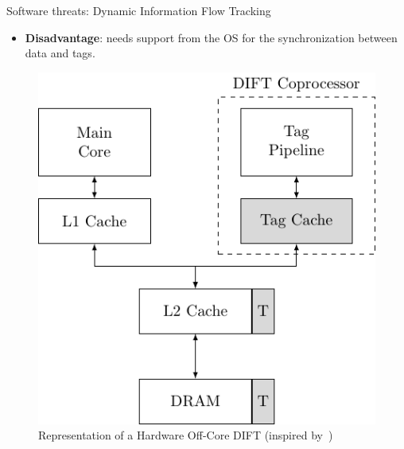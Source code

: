 \begin{frame}{Software threats: Dynamic Information Flow Tracking}
\begin{minipage}[c]{0.45\textwidth}
        \begin{alertblock}{}
            \begin{itemize}
                [square]
                \justifying
                \item \textbf{Disadvantage}: needs support from the OS for the synchronization between data and tags.
            \end{itemize}
        \end{alertblock}
    \end{minipage}\hfill%
    \begin{minipage}[c]{0.5\textwidth}
        \begin{figure}
            \centering
            \includegraphics[height=.75\textheight]{src/1_introduction/img/offcore.pdf}
            \caption{Representation of a Hardware Off-Core DIFT (inspired by~\cite{KDK-09-dsn})}
            \label{fig:offcore}
        \end{figure}
    \end{minipage}
\end{frame}

